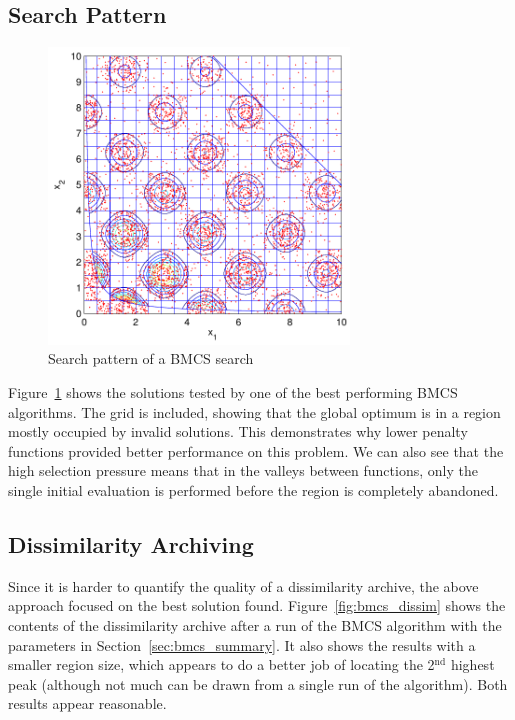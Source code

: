 \documentclass[10pt]{article}
\begin{document}
\subsection{Search Pattern}

\begin{figure}[tbp]
  \begin{center}
    \includegraphics[width=8cm]{bmcs_search_pattern.pdf}
    \end{center}
    \caption{Search pattern of a BMCS search}
    \label{fig:bmcs_search_pattern}
    \end{figure}

Figure~\ref{fig:bmcs_search_pattern} shows the solutions tested by one of the
best performing BMCS algorithms. The grid is included, showing that the global
optimum is in a region mostly occupied by invalid solutions. This demonstrates
why lower penalty functions provided better performance on this problem. We
can also see that the high selection pressure means that in the valleys
between functions, only the single initial evaluation is performed before the
region is completely abandoned.

\subsection{Dissimilarity Archiving}
\label{sec:bmcs_dissim}

Since it is harder to quantify the quality of a dissimilarity archive, the
above approach focused on the best solution found.
Figure~\ref{fig:bmcs_dissim} shows the contents of the dissimilarity archive
after a run of the BMCS algorithm with the parameters in
Section~\ref{sec:bmcs_summary}. It also shows the results with a smaller
region size, which appears to do a better job of locating the
2$^\textrm{nd}$ highest peak (although not much can be drawn from a single
run of the algorithm). Both results appear reasonable.
\end{document}
